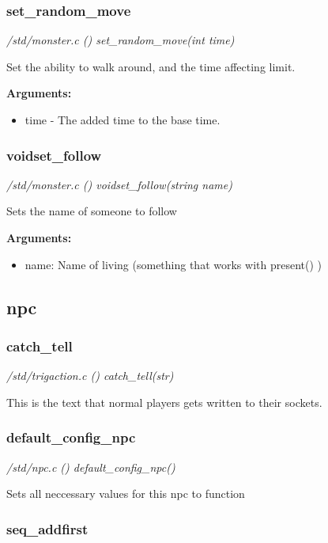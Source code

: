 \subsubsection{set\_random\_move}

{\em /std/monster.c () set\_random\_move(int time)}

Set the ability to walk around, and the
time affecting limit.

{\bf Arguments:}
\begin{itemize}
\item     time - The added time to the base time.
\end{itemize}


\subsubsection{voidset\_follow}

{\em /std/monster.c () voidset\_follow(string name)}

Sets the name of someone to follow

{\bf Arguments:}
\begin{itemize}
\item     name: Name of living (something that works with present() )
\end{itemize}


\subsection{npc}
\subsubsection{catch\_tell}

{\em /std/trigaction.c () catch\_tell(str)}

This is the text that normal players gets written to
their sockets.


\subsubsection{default\_config\_npc}

{\em /std/npc.c () default\_config\_npc()}

Sets all neccessary values for this npc to function


\subsubsection{seq\_addfirst}

